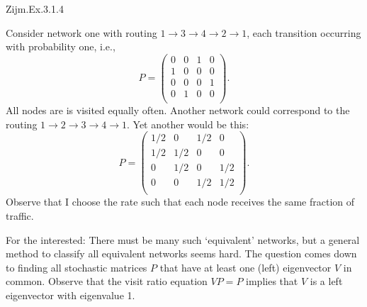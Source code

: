 \begin{exercise}
Zijm.Ex.3.1.4
\begin{solution}
Consider network one with routing $1\to3\to4\to2\to1$, each transition occurring with probability one, i.e.,
\begin{equation*}
  P =
  \begin{pmatrix}
    0 & 0 & 1 & 0  \\
    1 & 0 & 0 & 0  \\
    0 & 0 & 0 & 1  \\
    0 & 1 & 0 & 0  \\
  \end{pmatrix}.
\end{equation*}
All nodes are is visited equally often. Another network could correspond to the routing $1\to2\to3\to4\to1$.  Yet another would be this:
\begin{equation*}
  P =
  \begin{pmatrix}
    1/2 & 0   & 1/2 & 0  \\
    1/2 & 1/2 & 0 & 0  \\
    0   & 1/2 & 0 & 1/2  \\
    0   & 0   & 1/2 & 1/2  \\
  \end{pmatrix}.
\end{equation*}
Observe that I choose the rate such that each node receives the same
fraction of traffic.

For the interested: There must be many such `equivalent' networks, but
a general method to classify all equivalent networks seems hard. The
question comes down to finding all stochastic matrices $P$ that have
at least one (left) eigenvector $V$ in common. Observe that the visit
ratio equation $VP=P$ implies that $V$ is a left eigenvector with
eigenvalue 1.
\end{solution}
\end{exercise}

